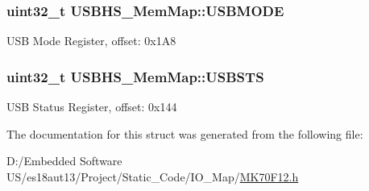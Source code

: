 \subsubsection[{U\+S\+B\+M\+O\+D\+E}]{\setlength{\rightskip}{0pt plus 5cm}uint32\+\_\+t U\+S\+B\+H\+S\+\_\+\+Mem\+Map\+::\+U\+S\+B\+M\+O\+D\+E}\label{struct_u_s_b_h_s___mem_map_afe4ec3963906653c83890dea008fac84}
U\+S\+B Mode Register, offset\+: 0x1\+A8 \hypertarget{struct_u_s_b_h_s___mem_map_ab651a6e6b81d8e4f97a9637833cc45b2}{}
\subsubsection[{U\+S\+B\+S\+T\+S}]{\setlength{\rightskip}{0pt plus 5cm}uint32\+\_\+t U\+S\+B\+H\+S\+\_\+\+Mem\+Map\+::\+U\+S\+B\+S\+T\+S}\label{struct_u_s_b_h_s___mem_map_ab651a6e6b81d8e4f97a9637833cc45b2}
U\+S\+B Status Register, offset\+: 0x144 

The documentation for this struct was generated from the following file\+:\begin{DoxyCompactItemize}
\item 
D\+:/\+Embedded Software U\+S/es18aut13/\+Project/\+Static\+\_\+\+Code/\+I\+O\+\_\+\+Map/\hyperlink{_m_k70_f12_8h}{M\+K70\+F12.\+h}\end{DoxyCompactItemize}
